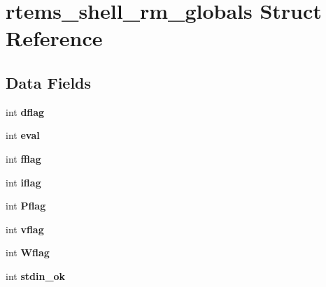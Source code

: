 \hypertarget{structrtems__shell__rm__globals}{}\section{rtems\+\_\+shell\+\_\+rm\+\_\+globals Struct Reference}
\label{structrtems__shell__rm__globals}
\subsection*{Data Fields}
\begin{DoxyCompactItemize}
\item 
\mbox{\label{structrtems__shell__rm__globals_a5bcb9503cbd4383887fbc3fb22f153fa}} 
int {\bfseries dflag}
\item 
\mbox{\label{structrtems__shell__rm__globals_a767cc5c2d2ba6e4c78986008b66deba8}} 
int {\bfseries eval}
\item 
\mbox{\label{structrtems__shell__rm__globals_a653b873e8b8ebbdf4989a555cb1fb199}} 
int {\bfseries fflag}
\item 
\mbox{\label{structrtems__shell__rm__globals_a9e460e63f55e8b69bc66cc2e143f594f}} 
int {\bfseries iflag}
\item 
\mbox{\label{structrtems__shell__rm__globals_a5bb13250e76a032622873e0c4f4a4d3e}} 
int {\bfseries Pflag}
\item 
\mbox{\label{structrtems__shell__rm__globals_a13e04583e64d6bbe7354b12fbdfdd3f9}} 
int {\bfseries vflag}
\item 
\mbox{\label{structrtems__shell__rm__globals_ae5dc9f25ed0daaae2b87a9aacbe504f4}} 
int {\bfseries Wflag}
\item 
\mbox{\label{structrtems__shell__rm__globals_a6c78d516fe6f37916a7128bbcb33dca9}} 
int {\bfseries stdin\+\_\+ok}
\item 
\mbox{\label{structrtems__shell__rm__globals_ab2f13ea20ce1487b2d4b8b6f2478939d}} 

\end{DoxyCompactItemize}
